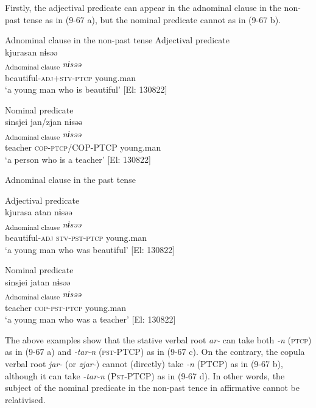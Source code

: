   Firstly, the adjectival predicate can appear in the adnominal clause in the non-past tense as in (9-67 a), but the nominal predicate cannot as in (9-67 b).

\ea  
\exi{} Adnominal clause in the non-past tense \label{ex:9.67}
\ea Adjectival predicate\\
 \glll  kjurasan  nɨsəə\\
    [\textit{kjura-sa+ar-n}]\textsubscript{Adnominal clause} \textit{nɨsəə}\\
    beautiful-\textsc{adj}+\textsc{stv}-\textsc{ptcp}  young.man\\
    \glt     ‘a young man who is beautiful’ [El: 130822]

\ex Nominal predicate\\
 \glll  *{\textbar}sinsjei{\textbar}  jan/zjan  nɨsəə\\
    [\textit{sinsjei}  \textit{jar-n}/\textit{zjar-n}]\textsubscript{Adnominal clause}  \textit{nɨsəə}\\
    teacher  \textsc{cop}-\textsc{ptcp}/COP-PTCP  young.man\\
     ‘a person who is a teacher’ [El: 130822]

\exi{} Adnominal clause in the past tense

\ex Adjectival predicate\\
 \glll  kjurasa  atan  nɨsəə\\
    [\textit{kjura-sa}  \textit{ar-tar-n}]\textsubscript{Adnominal clause}  \textit{nɨsəə}\\
    beautiful-\textsc{adj}  \textsc{stv}-\textsc{pst}-\textsc{ptcp}  young.man\\
    \glt     ‘a young man who was beautiful’ [El: 130822]

\ex Nominal predicate\\
 \glll  {\textbar}sinsjei{\textbar}  jatan  nɨsəə\\
    [\textit{sinsjei}  \textit{jar-tar-n}]\textsubscript{Adnominal clause}  \textit{nɨsəə}\\
    teacher  \textsc{cop}-\textsc{pst}-\textsc{ptcp}  young.man\\
    \glt      ‘a young man who was a teacher’ [El: 130822]
    \z
\z

The above examples show that the stative verbal root \textit{ar-} can take both \textit{{}-n} (\textsc{ptcp}) as in (9-67 a) and \textit{{}-tar-n} (\textsc{pst}-PTCP) as in (9-67 c). On the contrary, the copula verbal root \textit{jar-} (or \textit{zjar-}) cannot (directly) take \textit{{}-n} (PTCP) as in (9-67 b), although it can take \textit{{}-tar-n} (P\textsc{st}-PTCP) as in (9-67 d). In other words, the subject of the nominal predicate in the non-past tence in affirmative cannot be relativised.

